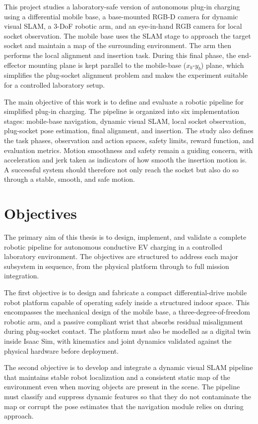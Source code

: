 \documentclass[10pt]{article}
\begin{document}
This project studies a laboratory-safe version of autonomous plug-in charging using a differential mobile base, a base-mounted RGB-D camera for dynamic visual SLAM, a 3-DoF robotic arm, and an eye-in-hand RGB camera for local socket observation. The mobile base uses the SLAM stage to approach the target socket and maintain a map of the surrounding environment. The arm then performs the local alignment and insertion task. During this final phase, the end-effector mounting plane is kept parallel to the mobile-base ($x_b$-$y_b$) plane, which simplifies the plug-socket alignment problem and makes the experiment suitable for a controlled laboratory setup.

The main objective of this work is to define and evaluate a robotic pipeline for simplified plug-in charging. The pipeline is organized into six implementation stages: mobile-base navigation, dynamic visual SLAM, local socket observation, plug-socket pose estimation, final alignment, and insertion. The study also defines the task phases, observation and action spaces, safety limits, reward function, and evaluation metrics. Motion smoothness and safety remain a guiding concern, with acceleration and jerk taken as indicators of how smooth the insertion motion is. A successful system should therefore not only reach the socket but also do so through a stable, smooth, and safe motion.

\clearpage
\section{Objectives}

The primary aim of this thesis is to design, implement, and validate a complete robotic pipeline for autonomous conductive EV charging in a controlled laboratory environment. The objectives are structured to address each major subsystem in sequence, from the physical platform through to full mission integration.

The first objective is to design and fabricate a compact differential-drive mobile robot platform capable of operating safely inside a structured indoor space. This encompasses the mechanical design of the mobile base, a three-degree-of-freedom robotic arm, and a passive compliant wrist that absorbs residual misalignment during plug-socket contact. The platform must also be modelled as a digital twin inside Isaac Sim, with kinematics and joint dynamics validated against the physical hardware before deployment.

The second objective is to develop and integrate a dynamic visual SLAM pipeline that maintains stable robot localization and a consistent static map of the environment even when moving objects are present in the scene. The pipeline must classify and suppress dynamic features so that they do not contaminate the map or corrupt the pose estimates that the navigation module relies on during approach.
\end{document}
